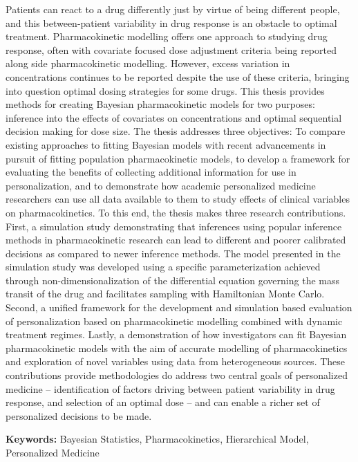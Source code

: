 \documentclass[12pt,twoside]{report}
\numberwithin{figure}{chapter}
\newenvironment{preliminary}%
{\pagestyle{plain}\pagenumbering{roman}}%
{\pagenumbering{arabic}}
\begin{document}
\begin{preliminary}
	Patients can react to a drug differently just by virtue of being different people, and this between-patient variability in drug response is an obstacle to optimal treatment.  Pharmacokinetic modelling offers one approach to studying drug response, often with covariate focused dose adjustment criteria being reported along side pharmacokinetic modelling.  However, excess variation in concentrations continues to be reported despite the use of these criteria, bringing into question optimal dosing strategies for some drugs.  This thesis provides methods for creating Bayesian pharmacokinetic models for two purposes: inference into the effects of covariates on concentrations and optimal sequential decision making for dose size.   The thesis addresses three objectives: To compare existing approaches to fitting Bayesian models with recent advancements in pursuit of fitting population pharmacokinetic models, to develop a framework for evaluating the benefits of collecting additional information for use in personalization, and to demonstrate how academic personalized medicine researchers can use all data available to them to study effects of clinical variables on pharmacokinetics. To this end, the thesis makes three research contributions. First, a simulation study demonstrating that inferences using popular inference methods in pharmacokinetic research can lead to different and poorer calibrated decisions as compared to newer inference methods.  The model presented in the simulation study was developed using a specific parameterization achieved through non-dimensionalization of the differential equation governing the mass transit of the drug and facilitates  sampling with Hamiltonian Monte Carlo. Second, a unified framework for the development and simulation based evaluation of personalization based on pharmacokinetic modelling combined with dynamic treatment regimes. Lastly, a demonstration of how investigators can fit Bayesian pharmacokinetic models with the aim of accurate modelling of pharmacokinetics and exploration of novel variables using data from heterogeneous sources.  These contributions provide methodologies do address two central goals of personalized medicine -- identification of factors driving between patient variability in drug response, and selection of an optimal dose --  and can enable a richer set of personalized decisions to be made.
	
	\vfill
	\textbf{Keywords:} Bayesian Statistics, Pharmacokinetics, Hierarchical Model, Personalized Medicine
	\newpage
	\tableofcontents\newpage
	\newpage
	\listoffigures
	\newpage
	\listoftables\newpage
\end{preliminary}
\end{document}
